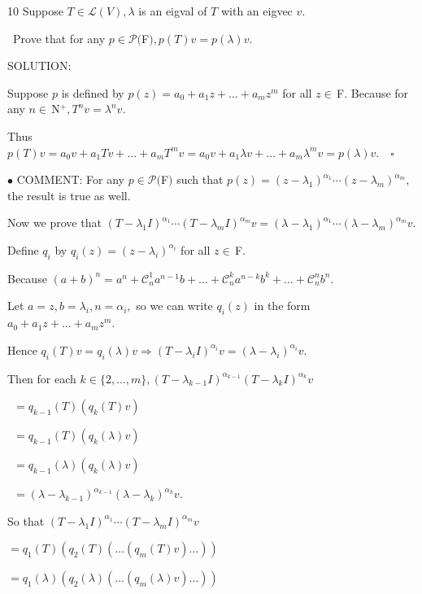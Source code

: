 \documentclass[a4paper, 11pt, UTF8]{article}
\def\Lm{\mathcal{L}}
\def\Po{\mathcal{P}}
\def\Fbfc{$\,{\timesbf F}$}
\def\Nbp{$\,{\timesbf N}$^+}
\begin{document}
\begin{large}
{\timesbf\Large 10} {\timessl\Large
Suppose $T\in\Lm(V),\lambda$ is an eigval of $T$ with an eigvec $v.$}\par\quad\,
{\timessl\Large Prove that for any $p\in\Po(${\timesbf F}$),p(T)v=p(\lambda)v.$}\par
{\timesbf S\footnotesize{OLUTION:}}\par\quad
Suppose $p$ is defined by $p(z)=a_0+a_1 z+\dots+a_m z^m$ for all $z\in\Fbfc.$ Because for any $n\in\Nbp,T^n v=\lambda^n v.$\par\quad
Thus $p(T)v=a_0 v+a_1 Tv+\dots+a_m T^m v=a_0 v+a_1 \lambda v+\dots+a_m \lambda^m v=p(\lambda)v.\quad\square$\par
{\small $\bullet$} {\timesbf C{\small OMMENT:}} For any $p\in\Po(${\timesbf F}$)$ such that $p(z)=(z-\lambda_1)^{\alpha_1}\cdots(z-\lambda_m)^{\alpha_m},$ the result is true as well.\par\quad
Now we prove that $(T-\lambda_1 I)^{\alpha_1}\cdots(T-\lambda_m I)^{\alpha_m}v=(\lambda-\lambda_1)^{\alpha_1}\cdots(\lambda-\lambda_m)^{\alpha_m}v.$\par\quad
Define $q_i$ by $q_i(z)=(z-\lambda_i)^{\alpha_i}$ for all $z\in\Fbfc.$\par\quad
Because $(a+b)^{n}=a^{n}+\mathcal{C}_{n}^1 a^{n-1}b+\dots+\mathcal{C}_{n}^{k} a^{n-k}b^{k}+\dots+\mathcal{C}_{n}^{n}b^n.$\par\quad
Let $a=z,b=\lambda_i,n=\alpha_i,$ so we can write $q_i(z)$ in the form $a_0+a_1 z+\dots+a_m z^m.$\par\quad
Hence $q_i(T)v=q_i(\lambda)v\Rightarrow(T-\lambda_i I)^{\alpha_i}v=(\lambda-\lambda_i)^{\alpha_i}v.$\par\quad
Then for each $k\in\{2,\dots,m\},(T-\lambda_{k-1}I)^{\alpha_{k-1}}(T-\lambda_k I)^{\alpha_k}v$\par\qquad\qquad\qquad\qquad\qquad\qquad\,
$=q_{k-1}(T)(q_k(T)v)$\par\qquad\qquad\qquad\qquad\qquad\qquad\,
$=q_{k-1}(T)(q_k(\lambda)v)$\par\qquad\qquad\qquad\qquad\qquad\qquad\,
$=q_{k-1}(\lambda)(q_k(\lambda)v)$\par\qquad\qquad\qquad\qquad\qquad\qquad\,
$=(\lambda-\lambda_{k-1})^{\alpha_{k-1}}(\lambda-\lambda_k)^{\alpha_k}v.$\par\quad
So that $(T-\lambda_1 I)^{\alpha_1}\cdots(T-\lambda_m I)^{\alpha_m}v$\par\qquad\quad
$=q_1(T)(q_2(T)(\dots(q_m(T)v)\dots))$\par\qquad\quad
$=q_1(\lambda)(q_2(\lambda)(\dots(q_m(\lambda)v)\dots))$\par\qquad\quad

\end{large}
\end{document}
